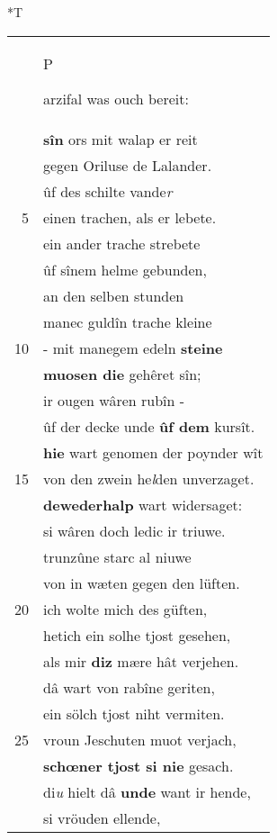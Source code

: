 \documentclass[8pt,a4paper,notitlepage]{article}
\begin{document}
\begin{table}[ht]
\begin{minipage}[t]{0.5\linewidth}
\end{minipage}
\hspace{0.5cm}
\begin{minipage}[t]{0.5\linewidth}
\small
\begin{center}*T
\end{center}
\begin{tabular}{rl}
 & \begin{large}P\end{large}arzifal was ouch bereit:\\ 
 & \textbf{sîn} ors mit walap er reit\\ 
 & gegen Oriluse de Lalander.\\ 
 & ûf des schilte vande\textit{r}\\ 
5 & einen trachen, als er lebete.\\ 
 & ein ander trache strebete\\ 
 & ûf sînem helme gebunden,\\ 
 & an den selben stunden\\ 
 & manec guldîn trache kleine\\ 
10 & - mit manegem edeln \textbf{steine}\\ 
 & \textbf{muosen die} gehêret sîn;\\ 
 & ir ougen wâren rubîn -\\ 
 & ûf der decke unde \textbf{ûf dem} kursît.\\ 
 & \textbf{hie} wart genomen der poynder wît\\ 
15 & von den zwein he\textit{l}den unverzaget.\\ 
 & \textbf{dewederhalp} wart widersaget:\\ 
 & si wâren doch ledic ir triuwe.\\ 
 & trunzûne starc al niuwe\\ 
 & von in wæten gegen den lüften.\\ 
20 & ich wolte mich des güften,\\ 
 & hetich ein solhe tjost gesehen,\\ 
 & als mir \textbf{diz} mære hât verjehen.\\ 
 & dâ wart von rabîne geriten,\\ 
 & ein sölch tjost niht vermiten.\\ 
25 & vroun Jeschuten muot verjach,\\ 
 & \textbf{schœner tjost si nie} gesach.\\ 
 & di\textit{u} hielt dâ \textbf{unde} want ir hende,\\ 
 & si vröuden ellende,\\ 

\end{tabular}
\end{minipage}
\end{table}
\end{document}
